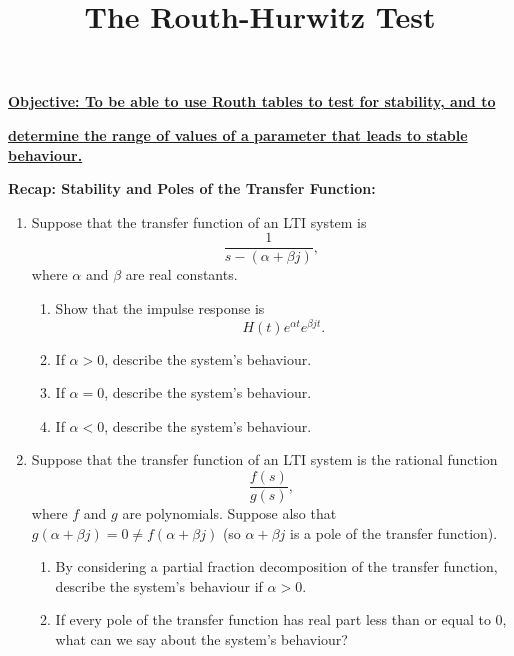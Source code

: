 \documentclass{article}
\begin{document}
\title{The Routh-Hurwitz Test}
\date{}

\maketitle
\thispagestyle{empty}

\Large

\vskip -10mm

\textbf{\underline{Objective: To be able to use Routh tables to test for stability, and to}}

\textbf{\underline{determine the range of values of a parameter that leads to stable behaviour.}}



\vspace{5mm}



\textbf{Recap: Stability and Poles of the Transfer Function:}\bigskip



\begin{enumerate}
	\item Suppose that the transfer function of an LTI system is
		\[\frac{1}{s-(\alpha+\beta j)},\]
		where $\alpha$ and $\beta$ are real constants.
		\begin{enumerate}
			\item Show that the impulse response is
				\[H(t)e^{\alpha t}e^{\beta j t}.\]
			\item If $\alpha>0$, describe the system's behaviour.
			\item If $\alpha= 0$, describe the system's behaviour.
			\item If $\alpha<0$, describe the system's behaviour.
		\end{enumerate}
	\item Suppose that the transfer function of an LTI system is the rational function
		\[\frac{f(s)}{g(s)},\]
		where $f$ and $g$ are polynomials. Suppose also that $g(\alpha+\beta j)=0\neq f(\alpha+\beta j)$ (so $\alpha+\beta j$ is a pole of the transfer function).
		\begin{enumerate}
			\item By considering a partial fraction decomposition of the transfer function, describe the system's behaviour if $\alpha>0$.
			\item If every pole of the transfer function has real part less than or equal to 0, what can we say about the system's behaviour?
		\end{enumerate}
\end{enumerate}
\end{document}
